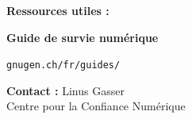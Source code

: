 \documentclass[a0paper,portrait]{baposter}
\begin{document}
\begin{poster}
{\begin{multicols}{3}
  \columnbreak
  
  \textbf{\color{c4dtblue}Ressources utiles :}
  
  \begin{center}
  
  \textbf{Guide de survie numérique}
  
  \texttt{gnugen.ch/fr/guides/}
  
  \vspace{1em}
  
  \textbf{Contact :} Linus Gasser\\
  Centre pour la Confiance Numérique
  \end{center}
  
  \end{multicols}
}

\end{poster}
\end{document}

